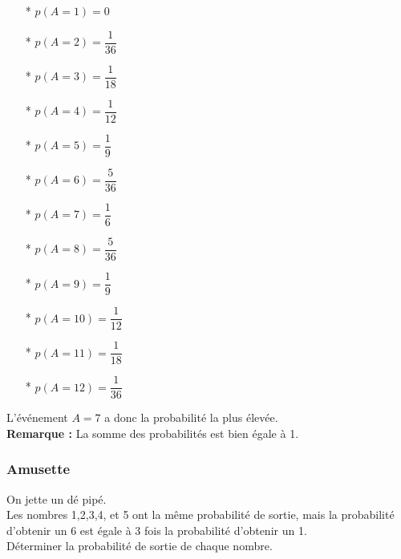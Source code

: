 \begin{itemize}
\item[*] $p\left(A = 1\right) = 0 $ \\
\item[*] $p\left(A = 2\right) = \dfrac{1}{36} $ \\
\item[*] $p\left(A = 3\right) = \dfrac{1}{18} $ \\
\item[*] $p\left(A = 4\right) = \dfrac{1}{12} $ \\
\item[*] $p\left(A = 5\right) = \dfrac{1}{9} $ \\
\item[*] $p\left(A = 6\right) = \dfrac{5}{36} $ \\
\item[*] $p\left(A = 7\right) = \dfrac{1}{6} $ \\
\item[*] $p\left(A = 8\right) = \dfrac{5}{36} $ \\
\item[*] $p\left(A = 9\right) = \dfrac{1}{9} $ \\
\item[*] $p\left(A = 10\right) = \dfrac{1}{12} $ \\
\item[*] $p\left(A = 11\right) = \dfrac{1}{18} $ \\
\item[*] $p\left(A = 12\right) = \dfrac{1}{36}  $ \\
\end{itemize}

L'événement $A=7$ a donc la probabilité la plus élevée. \\

\textbf{Remarque :} La somme des probabilités est bien égale à 1.

\newpage

\subsubsection{Amusette }

On jette un dé pipé. \\Les nombres 1,2,3,4, et 5 ont la même probabilité de sortie, mais la probabilité d'obtenir un 6 est égale à 3 fois la probabilité d'obtenir un 1. \\

Déterminer la probabilité de sortie de chaque nombre. \\


